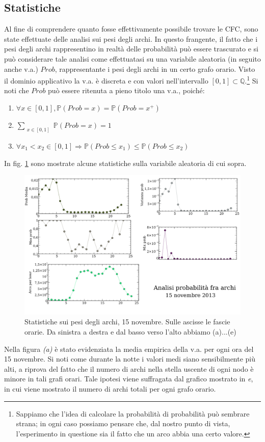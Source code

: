 \documentclass[10pt,a4paper]{article}
\begin{document}
\subsection{Statistiche}
Al fine di comprendere quanto fosse effettivamente possibile trovare le CFC, sono state effettuate delle analisi sui pesi degli archi. In questo frangente, il fatto che i pesi degli archi rappresentino in realtà delle probabilità può essere trascurato e si può considerare tale analisi come effettuatasi su una variabile aleatoria (in seguito anche v.a.) $Prob$, rappresentante i pesi degli archi in un certo grafo orario. Visto il dominio applicativo la v.a. è discreta e con valori nell'intervallo $[0,1] \subset \mathbb{Q}$.\footnote{Sappiamo che l'idea di calcolare la probabilità di probabilità può sembrare strana; in ogni caso possiamo pensare che, dal nostro punto di vista, l'esperimento in questione sia il fatto che un arco abbia una certo valore.}
Si noti che $Prob$ può essere ritenuta a pieno titolo una v.a., poiché:
\begin{enumerate}
\item $\forall x \in [0,1], \mathbb{P}(Prob = x) = \mathbb{P}(Prob = x^+)$
\item $\sum_{\substack{x \in [0,1]}}{ \mathbb{P}(Prob = x)} = 1$
\item $\forall x_1 < x_2 \in [0,1] \Rightarrow \mathbb{P}(Prob \leq x_1) \leq \mathbb{P}(Prob \leq x_2)$ 
\end{enumerate}
In fig. \ref{img:probs} sono mostrate alcune statistiche sulla variabile aleatoria di cui sopra.
\begin{figure}
 \includegraphics[scale=.6]{img/probs15nov.png}
 \caption{Statistiche sui pesi degli archi, 15 novembre. Sulle ascisse le fascie orarie. Da sinistra a destra e dal basso verso l'alto abbiamo (a)...(e)}
 \label{img:probs}
\end{figure}
Nella figura \emph{(a)} è stato evidenziata la media empirica della v.a. per ogni ora del 15 novembre. Si noti come durante la notte i valori medi siano sensibilmente più alti, a riprova del fatto che il numero di archi nella stella uscente di ogni nodo è minore in tali grafi orari. Tale ipotesi viene suffragata dal grafico mostrato in \emph{e}, in cui viene mostrato il numero di archi totali per ogni grafo orario. 
\end{document}
